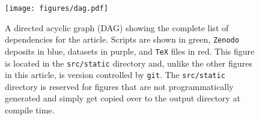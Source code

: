 \documentclass[modern]{aastex631}
\begin{document}


\begin{figure}[htp]
    \begin{centering}
        \texttt{[image: figures/dag.pdf]}
        \caption{
            A directed acyclic graph (DAG) showing the complete list of dependencies for the article. 
            Scripts are shown in green, \texttt{Zenodo} deposits in blue, datasets in purple, and \texttt{TeX} files in red.
            This figure is located in the \texttt{src/static} directory and, unlike the other figures in this article, is version controlled by \texttt{git}. The \texttt{src/static} directory is reserved for figures that are not programmatically generated and simply get copied over to the output directory at compile time.
        }
        \label{fig:dag}
    \end{centering}
\end{figure}


\end{document}
